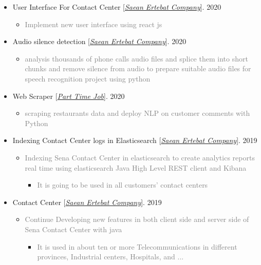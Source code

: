 \documentclass[10pt,a4paper,sans]{moderncv} %
\begin{document}
	\begin{itemize}
		
		\item User Interface For Contact Center [\href{http://www.senatelecom.com/}{\emph{Saean Ertebat Company}}]. \hfill 2020
		\begin{itemize}
			\item \textcolor{gray} {Implement new user interface using react js}
		\end{itemize}

		\item Audio silence detection [\href{http://www.senatelecom.com/}{\emph{Saean Ertebat Company}}]. \hfill 2020
		\begin{itemize}
			\item \textcolor{gray} {analysis thousands of phone calls audio files and splice them into short chunks and remove silence from audio to prepare suitable audio files for speech recognition project using python}
		\end{itemize}

		\item Web Scraper [\href{mailto:ma.mohammadizadeh@gmail.com}{\emph{Part Time Job}}]. \hfill 2020
		\begin{itemize}
			\item \textcolor{gray} {scraping restaurants data and deploy NLP on customer comments with Python}
		\end{itemize}

		\item Indexing Contact Center logs in Elasticsearch [\href{http://www.senatelecom.com/}{\emph{Saean Ertebat Company}}]. \hfill 2019
		\begin{itemize}
			\item \textcolor{gray} {Indexing Sena Contact Center in elasticsearch to create analytics reports real time using elasticsearch Java High Level REST client and Kibana}
			\begin{itemize}
				\item \textcolor{gray} {It is going to be used in all customers’ contact centers}
			\end{itemize}
		\end{itemize}

		\item Contact Center [\href{http://www.senatelecom.com/}{\emph{Saean Ertebat Company}}]. \hfill 2019
		\begin{itemize}
			\item \textcolor{gray} {Continue Developing new features in both client side and server side of Sena Contact Center  with java}
			\begin{itemize}
				\item \textcolor{gray} {It is used in about ten or more Telecommunications in different provinces, Industrial centers, Hospitals, and ...}
			\end{itemize}
		\end{itemize}



\end{itemize}
\end{document}
